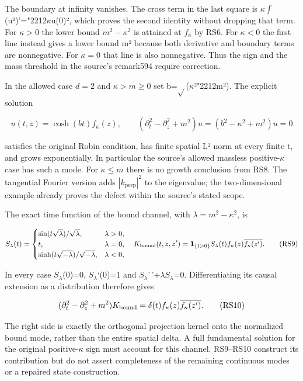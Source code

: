\documentclass[
  11pt,
]{article}
\begin{document}
The boundary at infinity vanishes. The cross term in the last square is
\ensuremath{\kappa}\ensuremath{\int}(\textbar u\textbar²)'={\ReaderSymbols\char"2212}\ensuremath{\kappa}\textbar u(0)\textbar², which proves the
second identity without dropping that term. For \(\kappa >0\) the lower
bound \(m^2-\kappa ^2\) is attained at \(f_\kappa \) by RS6. For
\(\kappa <0\) the first line instead gives a lower bound m² because both
derivative and boundary terms are nonnegative. For \(\kappa =0\) that
line is also nonnegative. Thus the sign and the mass threshold in the
source's remark594 require correction.

In the allowed case \(d=2\) and \(\kappa >m\geq 0\) set b=\ensuremath{\sqrt{}}(\ensuremath{\kappa}²{\ReaderSymbols\char"2212}m²). The
explicit solution

\[
 u(t,z)=\cosh(bt)f_\kappa(z),\qquad
 (\partial_t^2-\partial_z^2+m^2)u
             =(b^2-\kappa^2+m^2)u=0
 \tag{RS8}
\]

satisfies the original Robin condition, has finite spatial L² norm at
every finite t, and grows exponentially. In particular the source's
allowed massless positive-\ensuremath{\kappa} case has such a mode. For \(\kappa \leq m\)
there is no growth conclusion from RS8. The tangential Fourier version
adds \ensuremath{|k_{\mathrm{perp}}|^2} to the eigenvalue; the two-dimensional
example already proves the defect within the source's stated scope.

The exact time function of the bound channel, with
\(\lambda =m^2-\kappa ^2\), is

\[
 S_\lambda(t)=\begin{cases}
 \sin(t\sqrt\lambda)/\sqrt\lambda,&\lambda>0,\\
 t,&\lambda=0,\\
 \sinh(t\sqrt{-\lambda})/\sqrt{-\lambda},&\lambda<0,
 \end{cases}\quad
 K_{\rm bound}(t,z,z')=\boldsymbol1_{\{t>0\}}
                    S_\lambda(t)f_\kappa(z)\overline{f_\kappa(z')}.
 \tag{RS9}
\]

In every case \(S_\lambda \)(0)=0, \(S_\lambda \)`(0)=1 and
\(S_\lambda \)'\,'+\ensuremath{\lambda}\(S_\lambda \)=0. Differentiating its causal extension
as a distribution therefore gives

\[
 (\partial_t^2-\partial_z^2+m^2)K_{\rm bound}
       =\delta(t)f_\kappa(z)\overline{f_\kappa(z')}.
 \tag{RS10}
\]

The right side is exactly the orthogonal projection kernel onto the
normalized bound mode, rather than the entire spatial delta. A full
fundamental solution for the original positive-\ensuremath{\kappa} sign must account for
this channel. RS9--RS10 construct its contribution but do not assert
completeness of the remaining continuous modes or a repaired state
construction.
\end{document}

